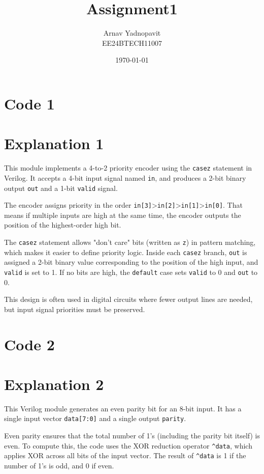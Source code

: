 \documentclass{article}
\title{Assignment1}
\author{Arnav Yadnopavit\\EE24BTECH11007}
\date{\today}
\begin{document}
\maketitle


\section*{Code 1}


\section*{Explanation 1}
This module implements a 4-to-2 priority encoder using the \texttt{casez} statement in Verilog. It accepts a 4-bit input signal named \texttt{in}, and produces a 2-bit binary output \texttt{out} and a 1-bit \texttt{valid} signal.

The encoder assigns priority in the order \texttt{in[3]}\textgreater\texttt{in[2]}\textgreater\texttt{in[1]}\textgreater\texttt{in[0]}. That means if multiple inputs are high at the same time, the encoder outputs the position of the highest-order high bit.

The \texttt{casez} statement allows "don’t care" bits (written as \texttt{z}) in pattern matching, which makes it easier to define priority logic. Inside each \texttt{casez} branch, \texttt{out} is assigned a 2-bit binary value corresponding to the position of the high input, and \texttt{valid} is set to 1. If no bits are high, the \texttt{default} case sets \texttt{valid} to 0 and \texttt{out} to 0.

This design is often used in digital circuits where fewer output lines are needed, but input signal priorities must be preserved.

\section*{Code 2}


\section*{Explanation 2}
This Verilog module generates an even parity bit for an 8-bit input. It has a single input vector \texttt{data[7:0]} and a single output \texttt{parity}.

Even parity ensures that the total number of 1's (including the parity bit itself) is even. To compute this, the code uses the XOR reduction operator \texttt{\^{}data}, which applies XOR across all bits of the input vector. The result of \texttt{\^{}data} is 1 if the number of 1's is odd, and 0 if even.
\end{document}
